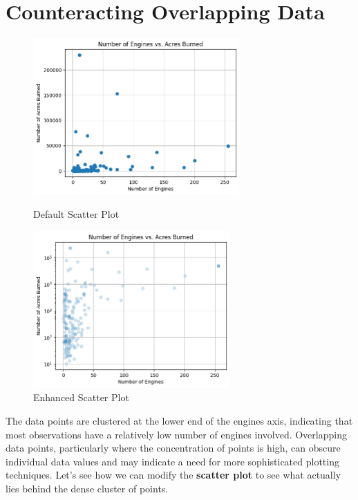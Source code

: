 \section*{Counteracting Overlapping Data}

\begin{figure}[h]
    \centering
    \begin{minipage}{.5\textwidth}
        \centering
        \includegraphics[height=6cm]{Images/figures/scatter_default.png}
        \caption{Default Scatter Plot}
        \label{fig:plot3}
    \end{minipage}%
    \begin{minipage}{.5\textwidth}
        \centering
        \includegraphics[height=6cm]{Images/figures/scatter_alpha_log.png}
        \caption{Enhanced Scatter Plot}
        \label{fig:plot4}
    \end{minipage}
\end{figure}

The data points are clustered at the lower end of the engines axis, indicating that most observations have a relatively low number of engines involved. Overlapping data points, particularly where the concentration of points is high, can obscure individual data values and may indicate a need for more sophisticated plotting techniques. Let's see how we can modify the \textbf{scatter plot} to see what actually lies behind the dense cluster of points.

